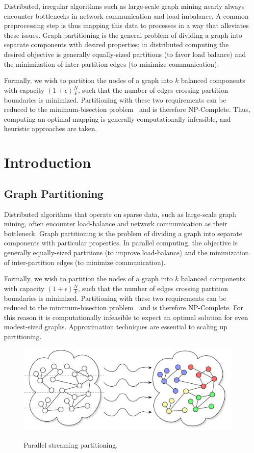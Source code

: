 
Distributed, irregular algorithms such as large-scale graph mining nearly always encounter bottlenecks in network communication and load imbalance. A common preprocessing step is thus mapping this data to processes in a way that alleviates these issues. Graph partitioning is the general problem of dividing a graph into separate components with desired properties; in distributed computing the desired objective is generally equally-sized partitions (to favor load balance) and the minimization of inter-partition edges (to minimize communication).

Formally, we wish to partition the nodes of a graph into $k$ balanced components with capacity $(1+\epsilon)\frac{N}{k}$, such that the number of edges crossing partition boundaries is minimized. Partitioning with these two requirements can be reduced to the minimum-bisection problem~\cite{Garey:1979:CIG:578533} and is therefore NP-Complete. Thus, computing an optimal mapping is generally computationally infeasible, and heuristic approaches are taken. 

\section{Introduction}
\subsection{Graph Partitioning}
Distributed algorithms that operate on sparse data, such as large-scale graph mining, often encounter load-balance and network communication as their bottleneck. 
Graph partitioning is the problem of dividing a graph into separate components with particular properties. 
In parallel computing, the objective is generally equally-sized partitions (to improve load-balance) and the minimization of inter-partition edges (to minimize communication).

Formally, we wish to partition the nodes of a graph into $k$ balanced components with capacity $(1+\epsilon)\frac{N}{k}$, such that the number of edges crossing partition boundaries is minimized. 
Partitioning with these two requirements can be reduced to the minimum-bisection problem~\cite{Garey:1979:CIG:578533} and is therefore NP-Complete. 
For this reason it is computationally infeasible to expect an optimal solution for even modest-sized graphs.
Approximation techniques are essential to scaling up partitioning.

\begin{figure}[ht]
\centering
  \includegraphics[width=0.7\columnwidth]{figures/coverfig.pdf}
  \label{fig:coverfig}
  \caption{Parallel streaming partitioning.}
\end{figure}

